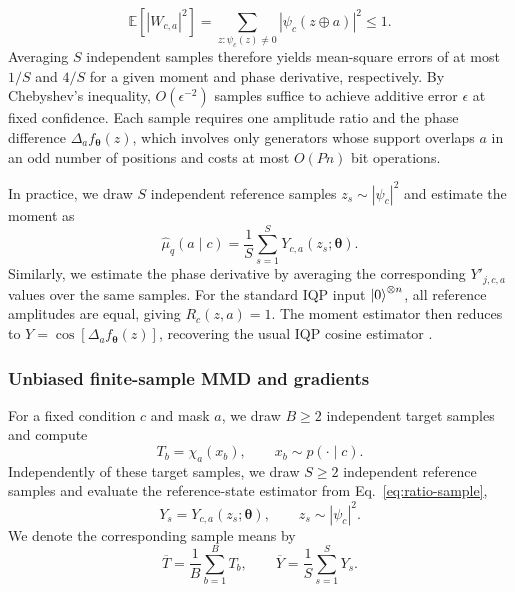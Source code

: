 \documentclass[pra,aps,10pt,twocolumn,floatfix,superscriptaddress, notitlepage,longbibliography]{revtex4-2}
\newcommand{\E}{\mathbb{E}}
\begin{document}
\begin{equation}
    \E[|W_{c,a}|^2]
    =\sum_{z:\psi_c(z)\neq0}|\psi_c(z\oplus a)|^2\leq1.
    \label{eq:ratio-second-moment}
\end{equation}
Averaging $S$ independent samples therefore yields mean-square errors of at most $1/S$ and $4/S$ for a given moment and phase derivative, respectively. By Chebyshev's inequality, $O(\epsilon^{-2})$ samples suffice to achieve additive error $\epsilon$ at fixed confidence. Each sample requires one amplitude ratio and the phase difference $\Delta_a f_{\boldsymbol\theta}(z)$, which involves only generators whose support overlaps $a$ in an odd number of positions and costs at most $O(Pn)$ bit operations.

In practice, we draw $S$ independent reference samples $z_s\sim|\psi_c|^2$ and estimate the moment as
\begin{equation}
    \widehat{\mu}_q(a\mid c)
    =
    \frac{1}{S}
    \sum_{s=1}^{S}
    Y_{c,a}(z_s;\boldsymbol{\theta}).
    \label{eq:conditional-pauli-monte-carlo}
\end{equation}
Similarly, we estimate the phase derivative by averaging the corresponding $Y'_{j,c,a}$ values over the same samples. For the standard IQP input $\ket{0}^{\otimes n}$, all reference amplitudes are equal, giving $R_c(z,a)=1$. The moment estimator then reduces to $Y=\cos[\Delta_a f_{\boldsymbol\theta}(z)]$, recovering the usual IQP cosine estimator \cite{nestSimulatingQuantumComputers2011,recio-armengolIQPoptFastOptimization2025}.

\subsubsection{Unbiased finite-sample MMD and gradients}
\label{sec:unbiased-conditional-mmd}

For a fixed condition $c$ and mask $a$, we draw $B\geq2$ independent target samples and compute
\begin{equation}
    T_b=\chi_a(x_b),
    \qquad
    x_b\sim p(\cdot\mid c).
\end{equation}
Independently of these target samples, we draw $S\geq2$ independent reference samples and evaluate the reference-state estimator from Eq.~\eqref{eq:ratio-sample},
\begin{equation}
    Y_s=
    Y_{c,a}(z_s;\boldsymbol{\theta}),
    \qquad
    z_s\sim|\psi_c|^2.
\end{equation}
We denote the corresponding sample means by
\begin{equation}
    \overline T=\frac{1}{B}\sum_{b=1}^{B}T_b,
    \qquad
    \overline Y=\frac{1}{S}\sum_{s=1}^{S}Y_s.
\end{equation}
\end{document}
